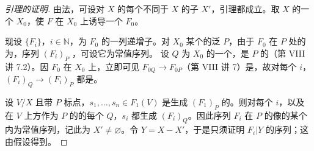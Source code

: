 \begin{proof}[引理的证明]
由法，可设对 $X$ 的每个不同于 $X$ 的子 $X'$，引理都成立。取 $X$ 的一个 $X_0$，使 $F$ 在 $X_0$ 上诱导一个 $F_0$。

现设 $\{F_i\}$，$i\in\mathbb N$，为 $F_0$ 的一列递增子。对 $X_0$ 某个的泛 $P$，由于 $F_0$ 在 $P$ 处的为，序列 $(F_i)_P$ ，可设它为常值序列。
设 $Q$ 为 $X_0$ 的一个，是 $P$ 的（第 VIII 讲 7.2）。因 $F_0$ 在 $X_0$ 上，立即可见 $F_{0Q}\to F_{0P}$（第 VIII 讲 7）是，故对每个 $i$，$(F_i)_Q\to(F_i)_P$ 都是。

设 $V/X$ 且带 $P$ 标点，$s_1,\ldots,s_n\in F_1(V)$ 是生成 $(F_1)_P$ 的。则对每个 $i$，以及在 $V$ 上方作为 $P$ 的的每个 $Q$，$s_i$ 都生成 $(F_i)_Q$。因此序列 $F_i$ 在 $P$ 的像的某个内为常值序列，记此为 $X'\ne\varnothing$。令 $Y=X-X'$，于是只须证明 $F_i|Y$ 的序列；这由假设得到。
\end{proof}
